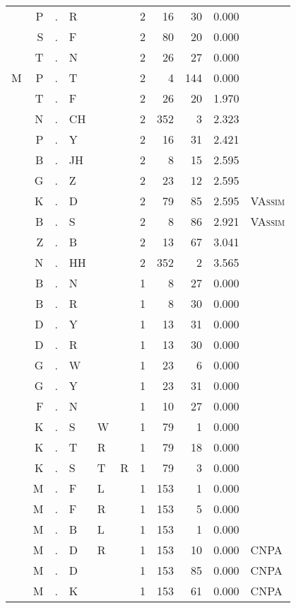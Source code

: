 \begin{longtable}{r@{ } r@{ } c@{ } l@{ } l@{ } l@{ } r r r r l }
  & P & . & R &   &   & 2 & 16 & 30 & 0.000 &  \\
  & S & . & F &   &   & 2 & 80 & 20 & 0.000 &  \\
  & T & . & N &   &   & 2 & 26 & 27 & 0.000 &  \\
M & P & . & T &   &   & 2 & 4 & 144 & 0.000 &  \\
  & T & . & F &   &   & 2 & 26 & 20 & 1.970 &  \\
  & N & . & CH &   &   & 2 & 352 & 3 & 2.323 &  \\
  & P & . & Y &   &   & 2 & 16 & 31 & 2.421 &  \\
  & B & . & JH &   &   & 2 & 8 & 15 & 2.595 &  \\
  & G & . & Z &   &   & 2 & 23 & 12 & 2.595 &  \\
  & K & . & D &   &   & 2 & 79 & 85 & 2.595 & \textsc{VAssim} \\
  & B & . & S &   &   & 2 & 8 & 86 & 2.921 & \textsc{VAssim} \\
  & Z & . & B &   &   & 2 & 13 & 67 & 3.041 &  \\
  & N & . & HH &   &   & 2 & 352 & 2 & 3.565 &  \\
  & B & . & N &   &   & 1 & 8 & 27 & 0.000 &  \\
  & B & . & R &   &   & 1 & 8 & 30 & 0.000 &  \\
  & D & . & Y &   &   & 1 & 13 & 31 & 0.000 &  \\
  & D & . & R &   &   & 1 & 13 & 30 & 0.000 &  \\
  & G & . & W &   &   & 1 & 23 & 6 & 0.000 &  \\
  & G & . & Y &   &   & 1 & 23 & 31 & 0.000 &  \\
  & F & . & N &   &   & 1 & 10 & 27 & 0.000 &  \\
  & K & . & S & W &   & 1 & 79 & 1 & 0.000 &  \\
  & K & . & T & R &   & 1 & 79 & 18 & 0.000 &  \\
  & K & . & S & T & R & 1 & 79 & 3 & 0.000 &  \\
  & M & . & F & L &   & 1 & 153 & 1 & 0.000 &  \\
  & M & . & F & R &   & 1 & 153 & 5 & 0.000 &  \\
  & M & . & B & L &   & 1 & 153 & 1 & 0.000 &  \\
  & M & . & D & R &   & 1 & 153 & 10 & 0.000 & \textsc{CNPA} \\
  & M & . & D &   &   & 1 & 153 & 85 & 0.000 & \textsc{CNPA} \\
  & M & . & K &   &   & 1 & 153 & 61 & 0.000 & \textsc{CNPA} \\

\end{longtable}
